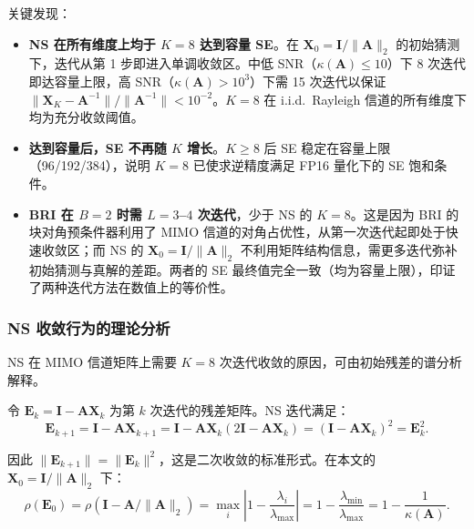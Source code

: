 \documentclass{CjC}
\begin{document}
    关键发现：
    \begin{itemize}
        \item \textbf{NS 在所有维度上均于 $K=8$ 达到容量 SE}。在 $\bm{X}_{0}=\bm{I}
            /\|\bm{A}\|_{2}$ 的初始猜测下，迭代从第 1 步即进入单调收敛区。中低 SNR（$\kappa
            (\bm{A})\leqslant 10$）下 8 次迭代即达容量上限，高 SNR（$\kappa(\bm{A}
            )>10^{3}$）下需 15 次迭代以保证 $\|\bm{X}_{K}-\bm{A}^{-1}\|/\|\bm{A}^{-1}
            \|<10^{-2}$。$K=8$ 在 i.i.d.\ Rayleigh
            信道的所有维度下均为充分收敛阈值。

        \item \textbf{达到容量后，SE 不再随 $K$ 增长}。$K\geqslant 8$ 后 SE
            稳定在容量上限（96/192/384），说明 $K=8$ 已使求逆精度满足 FP16
            量化下的 SE 饱和条件。

        \item \textbf{BRI 在 $B=2$ 时需 $L=3$--$4$ 次迭代}，少于 NS 的 $K=8$。这是因为
            BRI 的块对角预条件器利用了 MIMO
            信道的对角占优性，从第一次迭代起即处于快速收敛区；而 NS 的
            $\bm{X}_{0}=\bm{I}/\|\bm{A}\|_{2}$
            不利用矩阵结构信息，需更多迭代弥补初始猜测与真解的差距。两者的 SE
            最终值完全一致（均为容量上限），印证了两种迭代方法在数值上的等价性。
    \end{itemize}

    \subsubsection{NS 收敛行为的理论分析}
    \label{sec:ns-convergence-theory}

    NS 在 MIMO 信道矩阵上需要 $K=8$ 次迭代收敛的原因，可由初始残差的谱分析解释。

    令 $\bm{E}_{k}= \bm{I}- \bm{A}\bm{X}_{k}$ 为第 $k$ 次迭代的残差矩阵。NS 迭代满足：
    \begin{equation}
        \bm{E}_{k+1}= \bm{I}- \bm{A}\bm{X}_{k+1}= \bm{I}- \bm{A}\bm{X}_{k}(2\bm{I}
        - \bm{A}\bm{X}_{k}) = (\bm{I}- \bm{A}\bm{X}_{k})^{2}= \bm{E}_{k}^{2}.
    \end{equation}

    因此 $\|\bm{E}_{k+1}\| = \|\bm{E}_{k}\|^{2}$，这是二次收敛的标准形式。在本文的
    $\bm{X}_{0}= \bm{I}/\|\bm{A}\|_{2}$ 下：
    \begin{equation}
        \rho(\bm{E}_{0}) = \rho(\bm{I}- \bm{A}/\|\bm{A}\|_{2}) = \max_{i}\left|1
        - \frac{\lambda_{i}}{\lambda_{\max}}\right| = 1 - \frac{\lambda_{\min}}{\lambda_{\max}}
        = 1 - \frac{1}{\kappa(\bm{A})}.
    \end{equation}
\end{document}
